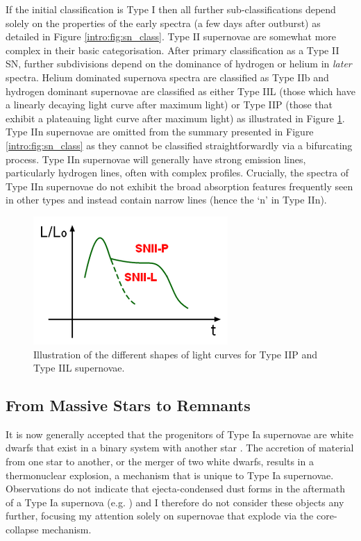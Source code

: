 If the initial classification is Type I then all further sub-classifications depend solely on the properties of the early spectra (a few days after outburst) as detailed in Figure \ref{intro:fig:sn_class}.  Type II supernovae are somewhat more complex in their basic categorisation.  After primary classification as a Type II SN, further subdivisions depend on the dominance of hydrogen or helium in \textit{later} spectra.  Helium dominated supernova spectra are classified as Type IIb and hydrogen dominant supernovae are classified as either Type IIL (those which have a linearly decaying light curve after maximum light) or Type IIP (those that exhibit a plateauing light curve after maximum light) as illustrated in Figure \ref{fig:light_curves}.  Type IIn supernovae are omitted from the summary presented in Figure \ref{intro:fig:sn_class} as they cannot be classified straightforwardly via a bifurcating process.  Type IIn supernovae will generally have strong emission lines, particularly hydrogen lines, often with complex profiles.  Crucially, the spectra of Type IIn supernovae do not exhibit the broad absorption features frequently seen in other types and instead contain narrow lines (hence the `n' in Type IIn).  

\begin{figure}
\centering
\includegraphics[clip=true, scale = 1, trim=0 0 0 0]{chapters/chapter1/figs/light_curves.png}
\caption{Illustration of the different shapes of light curves for Type IIP and Type IIL supernovae.}
\label{fig:light_curves}
\end{figure}

\subsection{From Massive Stars to Remnants}

It is now generally accepted that the progenitors of Type Ia supernovae are white dwarfs that exist in a binary system with another star \citep{Wang2012}.  The accretion of material from one star to another, or the merger of two white dwarfs, results in a thermonuclear explosion, a mechanism that is unique to Type Ia supernovae.   Observations do not indicate that ejecta-condensed dust forms in the aftermath of a Type Ia supernova (e.g. \citealt{Gomez2012a}) and I therefore do not consider these objects any further, focusing my attention solely on supernovae that explode via the core-collapse mechanism.  

